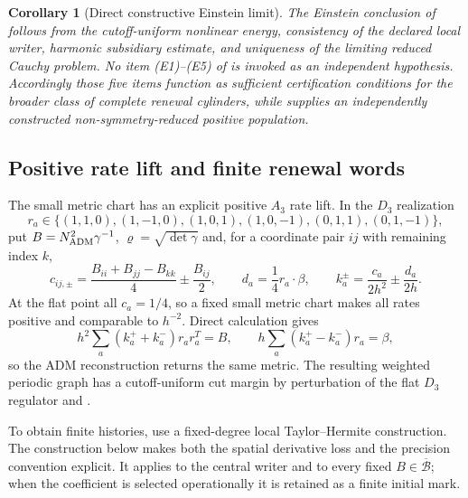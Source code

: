 \documentclass[11pt]{article}
\numberwithin{equation}{section}
\newtheorem{corollary}[corollary]{Corollary}
\theoremstyle{definition}
\theoremstyle{remark}
\begin{document}
\begin{corollary}[Direct constructive Einstein limit]
\label{cor:supp-open-direct-route}
The Einstein conclusion of  follows from the
cutoff-uniform nonlinear energy, consistency of the declared local writer,
harmonic subsidiary estimate, and uniqueness of the limiting reduced Cauchy
problem.  No item \textup{(E1)--(E5)} of
 is invoked as an independent hypothesis.
Accordingly those five items function as sufficient certification conditions
for the broader class of complete renewal cylinders, while
 supplies an independently constructed
non-symmetry-reduced positive population.
\end{corollary}

\subsection{Positive rate lift and finite renewal words}

The small metric chart has an explicit positive $A_3$ rate lift.  In the
$D_3$ realization
\begin{equation}
 r_a\in\{(1,1,0),(1,-1,0),(1,0,1),(1,0,-1),(0,1,1),(0,1,-1)\},
 \label{eq:supp-open-d3-roots}
\end{equation}
put $B=N_{\rm ADM}^2\gamma^{-1}$, $\varrho=\sqrt{\det\gamma}$ and, for a
coordinate pair $ij$ with remaining index $k$,
\begin{equation}
 c_{ij,\pm}=\frac{B_{ii}+B_{jj}-B_{kk}}4\pm\frac{B_{ij}}2,
 \qquad d_a=\frac14r_a\cdot\beta,\qquad
 k_a^\pm=\frac{c_a}{2h^2}\pm\frac{d_a}{2h}.
 \label{eq:supp-open-rate-lift}
\end{equation}
At the flat point all $c_a=1/4$, so a fixed small metric chart makes all
rates positive and comparable to $h^{-2}$.  Direct calculation gives
\begin{equation}
 h^2\sum_a(k_a^++k_a^-)r_ar_a^T=B,
 \qquad h\sum_a(k_a^+-k_a^-)r_a=\beta,
 \label{eq:supp-open-rate-inversion}
\end{equation}
so the ADM reconstruction returns the same metric.  The resulting weighted
periodic graph has a cutoff-uniform cut margin by perturbation of the flat
$D_3$ regulator and .

To obtain finite histories, use a fixed-degree local Taylor--Hermite
construction.  The construction below makes both the spatial derivative
loss and the precision convention explicit.  It applies to the central
writer and to every fixed $B\in\overline{\mathcal B}$; when the coefficient
is selected operationally it is retained as a finite initial mark.
\end{document}

